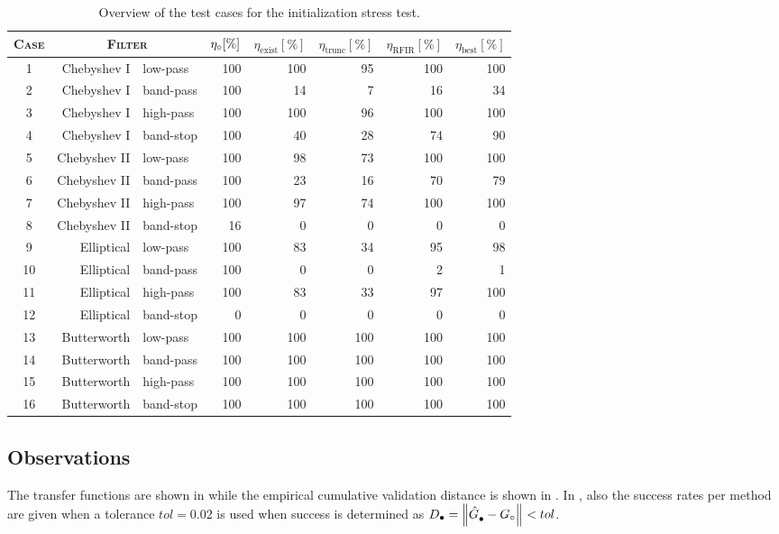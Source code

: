 \begin{table}
  \centering
  \caption{Overview of the test cases for the initialization stress test.}
\begin{tabular}{crlrrrrr}
\toprule
\textsc{Case}   &  \multicolumn{2}{c}{\textsc{Filter}}   &  ${\eta}_{\circ} [\%]$  &  $\eta_{\mathrm{exist}} [\%]$ &  $\eta_{\mathrm{trunc}} [\%]$   &  $\eta_{\mathrm{RFIR}} [\%]$  &  $\eta_{\mathrm{best}} [\%]$ \\
\midrule
1  &  {Chebyshev I}  &  low-pass   & 100 & 100 & 95  & 100 & 100\\
2  &  {Chebyshev I}  &  band-pass   & 100 & 14  & 7 & 16  & 34\\
3  &  {Chebyshev I}  &  high-pass     & 100 & 100 & 96  & 100 & 100\\
4  &  {Chebyshev I}  &  band-stop     & 100 & 40  & 28  & 74  & 90\\
5  &  {Chebyshev II}   &  low-pass     & 100 & 98  & 73  & 100 & 100\\
6  &  {Chebyshev II}   &  band-pass     & 100 & 23  & 16  & 70  & 79\\
7  &  {Chebyshev II}   &  high-pass     & 100 & 97  & 74  & 100 & 100\\
8  &  {Chebyshev II}   &  band-stop     & 16  & 0 & 0 & 0 & 0\\
9  &  Elliptical   &  low-pass     & 100 & 83  & 34  & 95  & 98\\
10   &  Elliptical   &  band-pass     & 100 & 0 & 0 & 2 & 1\\
11   &  Elliptical   &  high-pass     & 100 & 83  & 33  & 97  & 100\\
12   &  Elliptical   &  band-stop     & 0 & 0 & 0 & 0 & 0\\
13   &  Butterworth  &  low-pass     & 100 & 100 & 100 & 100 & 100\\
14   &  Butterworth  &  band-pass     & 100 & 100 & 100 & 100 & 100\\
15   &  Butterworth  &  high-pass     & 100 & 100 & 100 & 100 & 100\\
16   &  Butterworth  &  band-stop     & 100 & 100 & 100 & 100 & 100\\
\bottomrule
\end{tabular}
\label{tbl:init:stresstest}
\end{table}

\subsection{Observations}
The transfer functions are shown in  while the empirical cumulative validation distance is shown in .
In , also the success rates per method are given when a tolerance $tol = 0.02$ is used when success is determined as $D_{\bullet} = \left\| \hat{G}_{\mathrm{\bullet}}^{\mathrm{}} - {G}_{\circ} \right\|_{} < tol$.

